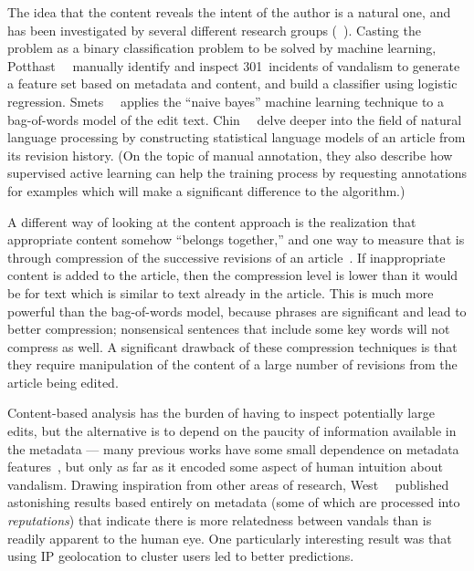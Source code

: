 The idea that the content reveals the intent of the author is a natural
one, and has been investigated by several different research groups
(\eg~\cite{Potthast2008,Smets2008,Druck2008,Itakura2009,Chin2010}).
Casting the problem as a binary classification problem to be solved by
machine learning, Potthast~\etal~\cite{Potthast2008} manually identify
and inspect 301~incidents of vandalism to generate a feature set based
on metadata and content, and build a classifier using
logistic regression.
Smets~\etal~\cite{Smets2008} applies the ``naive bayes'' machine
learning technique to a bag-of-words model of the edit text.
Chin~\etal~\cite{Chin2010} delve deeper into the field of
natural language processing by constructing statistical language
models of an article from its revision history.
(On the topic of manual annotation, they also describe how supervised
active learning can help the training process by requesting
annotations for examples which will make a significant difference to
the algorithm.)

A different way of looking at the content approach is the
realization that appropriate content somehow ``belongs together,'' and
one way to measure that is through compression of the successive
revisions of an article~\cite{Smets2008,Itakura2009}.
If inappropriate content is added to the article, then the compression
level is lower than it would be for text which is similar to text
already in the article.
This is much more powerful than the bag-of-words model, because
phrases are significant and lead to better compression; nonsensical
sentences that include some key words will not compress as well.
A significant drawback of these compression techniques is that they
require manipulation of the content of a large number of revisions
from the article being edited.

Content-based analysis has the burden of having to
inspect potentially large edits, but the alternative is to depend
on the paucity of information available in the metadata ---
many previous works have some small dependence on metadata
features~\cite{Potthast2008,Druck2008,Belani2010}, but only
as far as it encoded some aspect of human intuition about vandalism.
Drawing inspiration from other areas of research,
West~\etal~\cite{West2010} published astonishing results
based entirely on metadata (some of which are processed into
\textit{reputations}) that indicate there is more relatedness between
vandals than is readily apparent to the human eye.
One particularly interesting result was that using IP geolocation
to cluster users led to better predictions.

